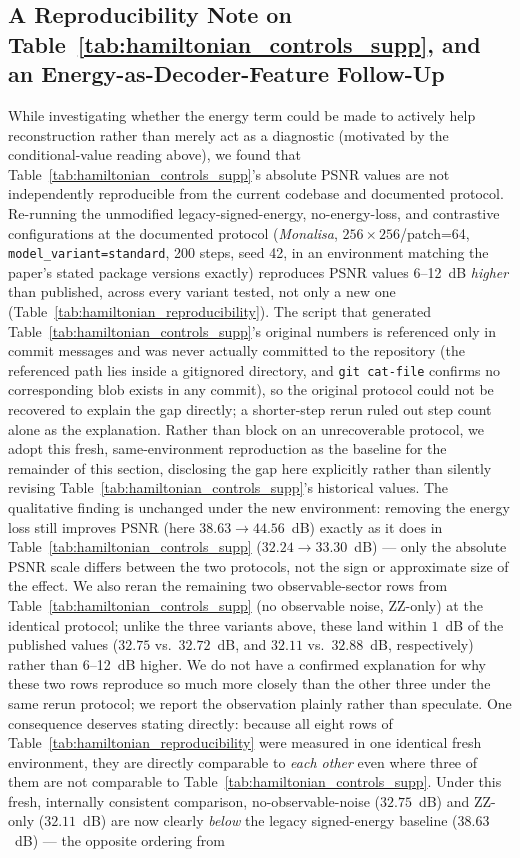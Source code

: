 \documentclass[11pt]{article}
\begin{document}
\subsection{A Reproducibility Note on Table~\ref{tab:hamiltonian_controls_supp}, and an Energy-as-Decoder-Feature Follow-Up}
\label{sec:hamiltonian_followup}
While investigating whether the energy term could be made to actively help reconstruction rather than merely act as a diagnostic (motivated by the conditional-value reading above), we found that Table~\ref{tab:hamiltonian_controls_supp}'s absolute PSNR values are not independently reproducible from the current codebase and documented protocol. Re-running the unmodified legacy-signed-energy, no-energy-loss, and contrastive configurations at the documented protocol (\textit{Monalisa}, $256\times256$/patch=64, \texttt{model\_variant=standard}, 200 steps, seed 42, in an environment matching the paper's stated package versions exactly) reproduces PSNR values 6--12~dB \emph{higher} than published, across every variant tested, not only a new one (Table~\ref{tab:hamiltonian_reproducibility}). The script that generated Table~\ref{tab:hamiltonian_controls_supp}'s original numbers is referenced only in commit messages and was never actually committed to the repository (the referenced path lies inside a gitignored directory, and \texttt{git cat-file} confirms no corresponding blob exists in any commit), so the original protocol could not be recovered to explain the gap directly; a shorter-step rerun ruled out step count alone as the explanation. Rather than block on an unrecoverable protocol, we adopt this fresh, same-environment reproduction as the baseline for the remainder of this section, disclosing the gap here explicitly rather than silently revising Table~\ref{tab:hamiltonian_controls_supp}'s historical values. The qualitative finding is unchanged under the new environment: removing the energy loss still improves PSNR (here $38.63\rightarrow44.56$~dB) exactly as it does in Table~\ref{tab:hamiltonian_controls_supp} ($32.24\rightarrow33.30$~dB) --- only the absolute PSNR scale differs between the two protocols, not the sign or approximate size of the effect. We also reran the remaining two observable-sector rows from Table~\ref{tab:hamiltonian_controls_supp} (no observable noise, ZZ-only) at the identical protocol; unlike the three variants above, these land within $1$~dB of the published values ($32.75$ vs.\ $32.72$~dB, and $32.11$ vs.\ $32.88$~dB, respectively) rather than 6--12~dB higher. We do not have a confirmed explanation for why these two rows reproduce so much more closely than the other three under the same rerun protocol; we report the observation plainly rather than speculate. One consequence deserves stating directly: because all eight rows of Table~\ref{tab:hamiltonian_reproducibility} were measured in one identical fresh environment, they are directly comparable to \emph{each other} even where three of them are not comparable to Table~\ref{tab:hamiltonian_controls_supp}. Under this fresh, internally consistent comparison, no-observable-noise ($32.75$~dB) and ZZ-only ($32.11$~dB) are now clearly \emph{below} the legacy signed-energy baseline ($38.63$~dB) --- the opposite ordering from 
\end{document}
